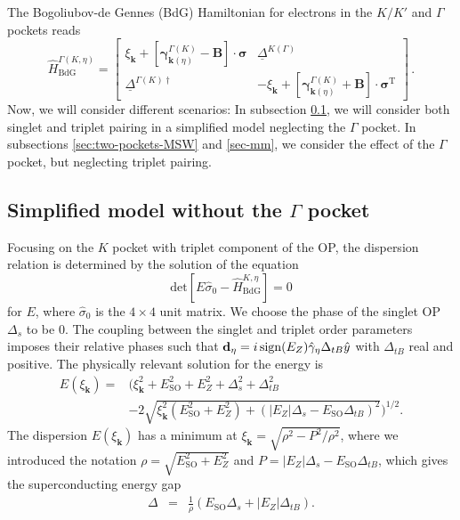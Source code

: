 \documentclass[showpacs,superscriptaddress,onecolumn,prb]{revtex4}
\begin{document}
The Bogoliubov-de Gennes (BdG) Hamiltonian for electrons in the $K/K'$ and $\Gamma$ pockets reads
\begin{equation}
\label{eq:BdG}
\hat{H}_{\mathrm{BdG}}^{\Gamma\left(K,\eta\right)}=\left[\begin{array}{cc}
\xi_{\mathbf{k}}+\left[\boldsymbol{\gamma}_{\mathbf{k}\left(\eta\right)}^{\Gamma\left(K\right)}-\mathbf{B}\right]\cdot\boldsymbol{\sigma} & \underline{\Delta}^{K\left(\Gamma\right)}\\
\underline{\Delta}^{\Gamma\left(K\right)\dagger} & -\xi_{\mathbf{k}}+\left[\boldsymbol{\gamma}_{\mathbf{k}\left(\eta\right)}^{\Gamma\left(K\right)}+\mathbf{B}\right]\cdot\boldsymbol{\sigma}^{\mathrm{T}}
\end{array}\right]\, .
\end{equation}
Now, we will consider different scenarios: In subsection \ref{sec-KK'}, we will consider both singlet and triplet pairing in a simplified model neglecting the $\Gamma$ pocket.
In subsections \ref{sec:two-pockets-MSW} and \ref{sec-mm}, we consider the effect of the $\Gamma$ pocket, but neglecting triplet pairing.

\subsection{Simplified model without the $\Gamma$ pocket}
\label{sec-KK'}

Focusing on the $K$ pocket with triplet component of the OP, the dispersion relation is determined by the solution of the equation
\begin{equation}
\mathrm{det}\left[E\hat{\sigma}_{0}-\hat{H}_{\mathrm{BdG}}^{K,\eta}\right]=0\label{eq:1.20}
\end{equation}
 for $E$, where $\hat{\sigma}_{0}$ is the $4\times4$ unit matrix. We choose
the phase of the singlet OP $\Delta_s$ to be $0$. The coupling between the singlet and triplet order parameters imposes their relative phases such that $\mathbf{d}_\eta=i\,{\rm sign}(E_Z)\hat{\gamma}_\eta\Delta_{tB}\hat{y}$ with $\Delta_{tB}$ real and positive. The physically
relevant solution for the energy is
\begin{align}
E\left(\xi_{\mathbf{k}}\right)  =&\biggr(\xi_{\mathbf{k}}^{2}+E_{\mathrm{SO}}^{2}+E_Z^{2}+\Delta_s^2+\Delta_{tB}^{2}\label{eq:1.21}\\
 & -2\sqrt{\xi_{\mathbf{k}}^{2}\left(E_{\mathrm{SO}}^2+E_Z^{2}\right)+\left(|E_Z|\Delta_s-E_{\mathrm{SO}}\Delta_{tB}\right)^{2}}\biggr)^{1/2}.\nonumber 
\end{align}
The dispersion $E\left(\xi_{\mathbf{k}}\right)$ has a minimum at
$\xi_{\mathbf{k}}=\sqrt{\rho^2-P^{2}/\rho^{2}}$, where we introduced the notation $\rho=\sqrt{E_{\mathrm{SO}}^{2}+E_Z^2}$ and  $P=|E_Z|\Delta_s-E_{\mathrm{SO}}\Delta_{tB}$, which gives 
the superconducting energy gap
\begin{eqnarray}
\Delta&=&\frac1{\rho}\left(E_{\mathrm{SO}}\Delta_s+|E_Z|\Delta_{tB}\right).\label{eq:1.22}
\end{eqnarray}
\end{document}

